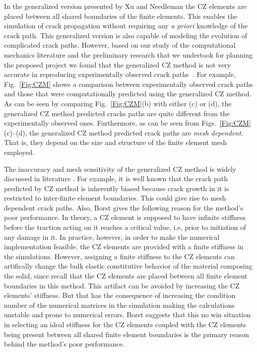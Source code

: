\documentclass[12pt,onecolumn]{article}
\begin{document}
In the generalized version presented by Xu and Needleman the CZ elements are placed between all shared boundaries of the finite elements. This enables the simulation of crack propagation without requiring any \textit{a priori} knowledge of the crack path. This  generalized version is also capable of modeling the evolution of complicated crack paths. However, based on our study of the computational mechanics literature and the preliminary research that we undertook for planning the proposed project we found that the  generalized  CZ method is not very accurate in reproducing experimentally observed crack paths~\cite{tijssens2000numerical,de2003numerical,de2004computational}. For example,  Fig.~\ref{Fig:CZM} shows a comparison between   experimentally observed crack paths  and those that were computationally predicted using the generalized CZ method. As can be seen by comparing Fig.~\ref{Fig:CZM}(b) with either (c) or (d),  the generalized CZ method predicted cracks paths are quite different from the experimentally observed ones.  Furthermore,   as can be seen from  Figs.~\ref{Fig:CZM}(c)--(d), the generalized CZ method predicted crack paths are \textit{mesh dependent}. That is, they depend on the size and structure of the finite element mesh employed.



The inaccuracy and  mesh sensitivity of the generalized CZ method is widely discussed in literature \cite{de2003numerical,de2004computational,tijssens2000numerical,song2008comparative}.  For example, it is well known that  the crack path predicted by CZ method is inherently biased because crack growth in it is restricted to inter-finite element boundaries. This could give rise to mesh dependent crack paths. Also, Borst \cite{de2003numerical,de2004computational} gives the following reason for the method's poor performance. In theory, a CZ element is supposed to have infinite stiffness before the traction acting on it reaches a critical value, i.e, prior to initiation of any damage in it. In practice, however, in order to make the numerical implementation feasible, the CZ elements are provided with a finite stiffness  in the simulations. However, assigning a finite stiffness to the CZ elements can artifically change the bulk elastic constitutive behavior of the material composing the solid, since recall that the CZ elements are placed between all finite element boundaries in this method. This artifact can be avoided by increasing the CZ elements' stiffness. But that has the consequence of increasing the condition number of the numerical matrices in the simulation making the calculations unstable and prone to numerical errors. Borst suggests that this no win situation in selecting an ideal stiffness for the CZ elements coupled with the CZ elements being present between all shared finite element boundaries is the primary reason behind the method's poor performance.
\end{document}
